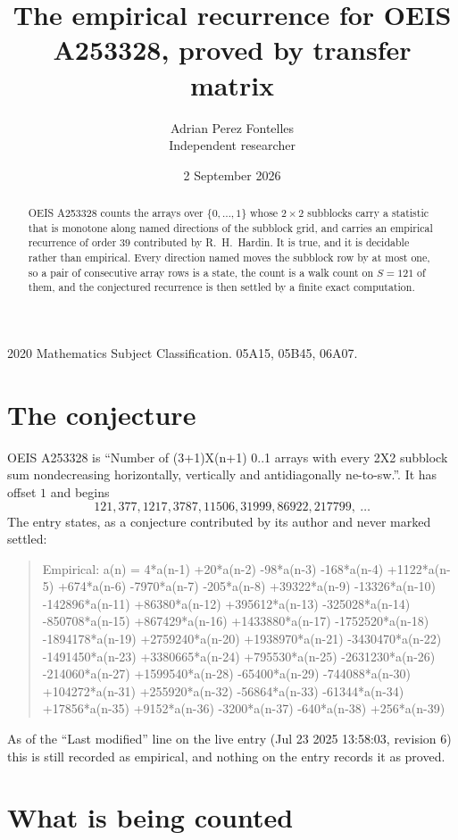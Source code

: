 \documentclass[11pt,a4paper]{article}
\title{The empirical recurrence for OEIS A253328, proved by transfer matrix}
\author{Adrian Perez Fontelles\\ \small Independent researcher}
\date{2 September 2026}
\theoremstyle{plain}
\theoremstyle{definition}
\begin{document}
\maketitle

\begin{abstract}
OEIS A253328 counts the arrays over $\{0,\dots,1\}$ whose $2\times2$ subblocks carry a
statistic that is monotone along named directions of the subblock grid, and carries an
empirical recurrence of order $39$ contributed by R.~H.~Hardin. It is true, and it is
decidable rather than empirical. Every direction named moves the subblock row by at most one,
so a pair of consecutive array rows is a state, the count is a walk count on $S=121$ of them,
and the conjectured recurrence is then settled by a finite exact computation.
\end{abstract}

\noindent\small 2020 Mathematics Subject Classification. 05A15, 05B45, 06A07.\normalsize

\section{The conjecture}

OEIS A253328 is ``Number of (3+1)X(n+1) 0..1 arrays with every 2X2 subblock sum nondecreasing horizontally, vertically and antidiagonally ne-to-sw.''. It has offset $1$ and begins
\[
121, 377, 1217, 3787, 11506, 31999, 86922, 217799,\ \dots
\]
The entry states, as a conjecture contributed by its author and never marked settled:
\begin{quote}
Empirical: a(n) = 4*a(n-1) +20*a(n-2) -98*a(n-3) -168*a(n-4) +1122*a(n-5) +674*a(n-6) -7970*a(n-7) -205*a(n-8) +39322*a(n-9) -13326*a(n-10) -142896*a(n-11) +86380*a(n-12) +395612*a(n-13) -325028*a(n-14) -850708*a(n-15) +867429*a(n-16) +1433880*a(n-17) -1752520*a(n-18) -1894178*a(n-19) +2759240*a(n-20) +1938970*a(n-21) -3430470*a(n-22) -1491450*a(n-23) +3380665*a(n-24) +795530*a(n-25) -2631230*a(n-26) -214060*a(n-27) +1599540*a(n-28) -65400*a(n-29) -744088*a(n-30) +104272*a(n-31) +255920*a(n-32) -56864*a(n-33) -61344*a(n-34) +17856*a(n-35) +9152*a(n-36) -3200*a(n-37) -640*a(n-38) +256*a(n-39)
\end{quote}
As of the ``Last modified'' line on the live entry (Jul 23 2025 13:58:03, revision 6) this is still
recorded as empirical, and nothing on the entry records it as proved.

\section{What is being counted}
\end{document}
